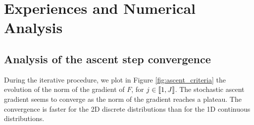 \section{Experiences and Numerical Analysis}

\subsection{Analysis of the ascent step convergence}
\label{sec:ascent_convergence}
 During the iterative procedure, we plot in Figure \ref{fig:ascent_criteria} the evolution of the norm of the gradient of $F$, for $j \in [\![ 1, J ]\!]$. The stochastic ascent gradient seems to converge as the norm of the gradient reaches a plateau. The convergence is faster for the 2D discrete distributions than for the 1D continuous distributions. 

